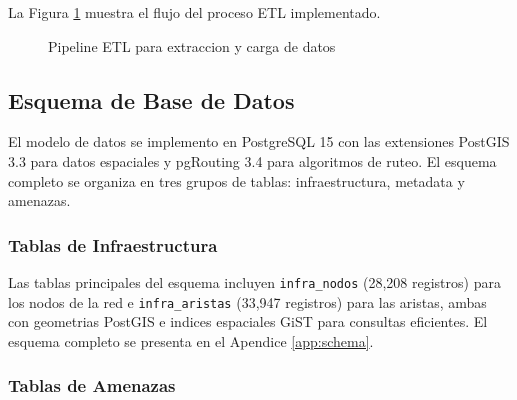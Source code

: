 \documentclass[conference]{IEEEtran}
\begin{document}
La Figura \ref{fig:etl} muestra el flujo del proceso ETL implementado.

\begin{figure}[!t]
\centering
{}
\caption{Pipeline ETL para extraccion y carga de datos}
\label{fig:etl}
\end{figure}

\subsection{Esquema de Base de Datos}

El modelo de datos se implemento en PostgreSQL 15 con las extensiones PostGIS 3.3 para datos espaciales y pgRouting 3.4 para algoritmos de ruteo. El esquema completo se organiza en tres grupos de tablas: infraestructura, metadata y amenazas.

\subsubsection{Tablas de Infraestructura}

Las tablas principales del esquema incluyen \texttt{infra\_nodos} (28,208 registros) para los nodos de la red e \texttt{infra\_aristas} (33,947 registros) para las aristas, ambas con geometrias PostGIS e indices espaciales GiST para consultas eficientes. El esquema completo se presenta en el Apendice \ref{app:schema}.

\subsubsection{Tablas de Amenazas}
\end{document}
